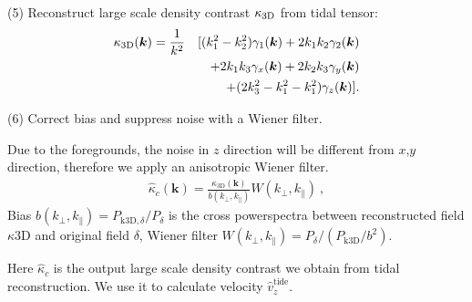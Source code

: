 (5) Reconstruct large scale density contrast $\kappa_\mathrm{3D}$ from tidal tensor:
\begin{eqnarray}
\kappa_\mathrm{3D}(\bm{k})=\frac{1}{k^2}
&&[(k_1^2-k_2^2)\gamma_1(\bm{k})+2k_1k_2\gamma_2(\bm{k})\nonumber\\
&&+2k_1k_3\gamma_x(\bm{k})+2k_2k_3\gamma_y(\bm{k})\\\nonumber
&&+(2k_3^2-k_1^2-k_1^2)\gamma_z(\bm{k})].
\end{eqnarray}

(6) Correct bias and suppress noise with a Wiener filter.

Due to the foregrounds, the noise in $z$ direction will be different from $x$,$y$ direction, therefore we apply an anisotropic Wiener filter.
\begin{eqnarray}
	\label{eq:wiener}
    \hat \kappa_{c}(\bm{k})=\frac{\kappa_{\mathrm{3D}}(\bm{k})}{b(k_\perp,k_\parallel)}W(k_\perp,k_\parallel)\ ,
\end{eqnarray}
Bias $b(k_\perp,k_\parallel)=P_{\mathrm{k3D,}\delta}/P_\delta$ 
is the cross powerspectra between reconstructed field $\kappa\mathrm{3D}$ and original field $\delta$, 
Wiener filter $W(k_\perp,k_\parallel)=P_\delta/(P_{\mathrm{k3D}}/b^2)$.

Here $\hat \kappa_{c}$ is the output large scale density contrast we obtain from tidal reconstruction.
We use it to calculate velocity $\hat v_z^{\mathrm{tide}}$.
\fi
